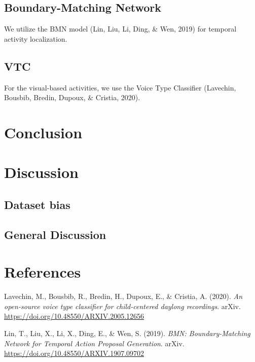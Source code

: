\documentclass[
  man,floatsintext]{apa6}
\newlength{\cslhangindent}
\newenvironment{CSLReferences}[2] %
 {\begin{list}{}{%
  \setlength{\itemindent}{0pt}
  \setlength{\leftmargin}{0pt}
  \setlength{\parsep}{0pt}
  \ifodd #1
   \setlength{\leftmargin}{\cslhangindent}
   \setlength{\itemindent}{-1\cslhangindent}
  \fi
  \setlength{\itemsep}{#2\baselineskip}}}
 {\end{list}}
\begin{document}
\subsection{Boundary-Matching Network}\label{boundary-matching-network}

We utilize the BMN model (Lin, Liu, Li, Ding, \& Wen, 2019) for temporal activity localization.

\subsection{VTC}\label{vtc}

For the visual-based activities, we use the Voice Type Classifier (Lavechin, Bousbib, Bredin, Dupoux, \& Cristia, 2020).

\section{Conclusion}\label{conclusion}

\section{Discussion}\label{discussion}

\subsection{Dataset bias}\label{dataset-bias}

\subsection{General Discussion}\label{general-discussion}

\newpage

\section{References}\label{references}

\begingroup
\setlength{\parindent}{-0.5in}
\setlength{\leftskip}{0.5in}

\label{refs}
\begin{CSLReferences}{1}{0}
Lavechin, M., Bousbib, R., Bredin, H., Dupoux, E., \& Cristia, A. (2020). \emph{An open-source voice type classifier for child-centered daylong recordings}. arXiv. \url{https://doi.org/10.48550/ARXIV.2005.12656}

Lin, T., Liu, X., Li, X., Ding, E., \& Wen, S. (2019). \emph{{BMN}: {Boundary-Matching Network} for {Temporal Action Proposal Generation}}. arXiv. \url{https://doi.org/10.48550/ARXIV.1907.09702}

\end{CSLReferences}
\end{document}
